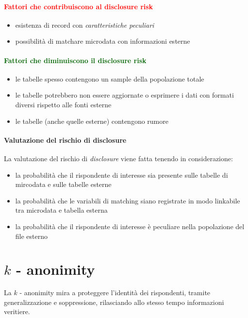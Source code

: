 \documentclass{report}
\begin{document}
\subsubsection{\textcolor{red}{Fattori che contribuiscono al disclosure risk}}
\begin{itemize}
    \item esistenza di record con \textit{caratteristiche peculiari}
    \item possibilità di matchare microdata con informazioni esterne 
\end{itemize}

\subsubsection{\textcolor{darkgreen}{Fattori che diminuiscono il disclosure risk}}
\begin{itemize}
    \item le tabelle spesso contengono un sample della popolazione totale
    \item le tabelle potrebbero non essere aggiornate o esprimere i dati con formati diversi rispetto alle fonti esterne 
    \item le tabelle (anche quelle esterne) contengono rumore
\end{itemize}

\subsubsection{Valutazione del rischio di disclosure}
La valutazione del rischio di \textit{disclosure} viene fatta tenendo in considerazione:
\begin{itemize}
    \item la probabilità che il rispondente di interesse sia presente sulle tabelle di mircodata e sulle tabelle esterne 
    \item la probabilità che le variabili di matching siano registrate in modo linkabile tra microdata e tabella esterna 
    \item la probabilità che il rispondente di interesse è peculiare nella popolazione del file esterno 
\end{itemize}

\chapter{$k$ - anonimity}

La $k$ - anonimity mira a proteggere l'identità dei rispondenti, tramite generalizzazione e soppressione, 
rilasciando allo stesso tempo informazioni veritiere.
\end{document}
